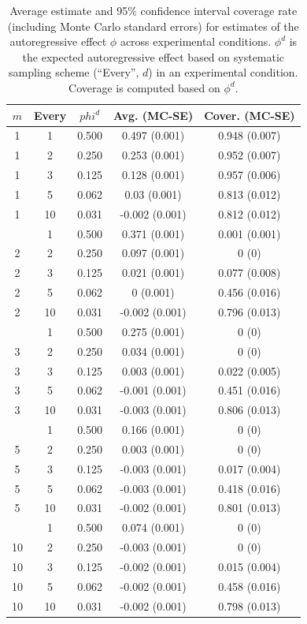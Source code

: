 \documentclass[man]{apa7} %
\begin{document}
 \begin{table}[]
    \centering
    \footnotesize
    \begin{tabular}[t]{ccccc}
        \toprule
        $m$ & Every & $phi^{d}$ & Avg. (MC-SE) & Cover. (MC-SE)\\
        \midrule
        1 & 1 & 0.500 & 0.497 (0.001) & 0.948 (0.007)\\
        1 & 2 & 0.250 & 0.253 (0.001) & 0.952 (0.007)\\
        1 & 3 & 0.125 & 0.128 (0.001) & 0.957 (0.006)\\
        1 & 5 & 0.062 & 0.03 (0.001) & 0.813 (0.012)\\
        1 & 10 & 0.031 & -0.002 (0.001) & 0.812 (0.012)\\
        \addlinespace
        2 & 1 & 0.500 & 0.371 (0.001) & 0.001 (0.001)\\
        2 & 2 & 0.250 & 0.097 (0.001) & 0 (0)\\
        2 & 3 & 0.125 & 0.021 (0.001) & 0.077 (0.008)\\
        2 & 5 & 0.062 & 0 (0.001) & 0.456 (0.016)\\
        2 & 10 & 0.031 & -0.002 (0.001) & 0.796 (0.013)\\
        \addlinespace
        3 & 1 & 0.500 & 0.275 (0.001) & 0 (0)\\
        3 & 2 & 0.250 & 0.034 (0.001) & 0 (0)\\
        3 & 3 & 0.125 & 0.003 (0.001) & 0.022 (0.005)\\
        3 & 5 & 0.062 & -0.001 (0.001) & 0.451 (0.016)\\
        3 & 10 & 0.031 & -0.003 (0.001) & 0.806 (0.013)\\
        \addlinespace
        5 & 1 & 0.500 & 0.166 (0.001) & 0 (0)\\
        5 & 2 & 0.250 & 0.003 (0.001) & 0 (0)\\
        5 & 3 & 0.125 & -0.003 (0.001) & 0.017 (0.004)\\
        5 & 5 & 0.062 & -0.003 (0.001) & 0.418 (0.016)\\
        5 & 10 & 0.031 & -0.002 (0.001) & 0.801 (0.013)\\
        \addlinespace
        10 & 1 & 0.500 & 0.074 (0.001) & 0 (0)\\
        10 & 2 & 0.250 & -0.003 (0.001) & 0 (0)\\
        10 & 3 & 0.125 & -0.002 (0.001) & 0.015 (0.004)\\
        10 & 5 & 0.062 & -0.002 (0.001) & 0.458 (0.016)\\
        10 & 10 & 0.031 & -0.002 (0.001) & 0.798 (0.013)\\
        \bottomrule
    \end{tabular}
    \caption{Average estimate and 95\% confidence interval coverage rate (including Monte Carlo standard errors) for estimates of the autoregressive effect $\phi$ across experimental conditions. $\phi^{d}$ is the expected autoregressive effect based on systematic sampling scheme (``Every'', $d$) in an experimental condition. Coverage is computed based on $\phi^{d}$.}
    \label{tab:scenario1-appendix}
\end{table}
\end{document}

